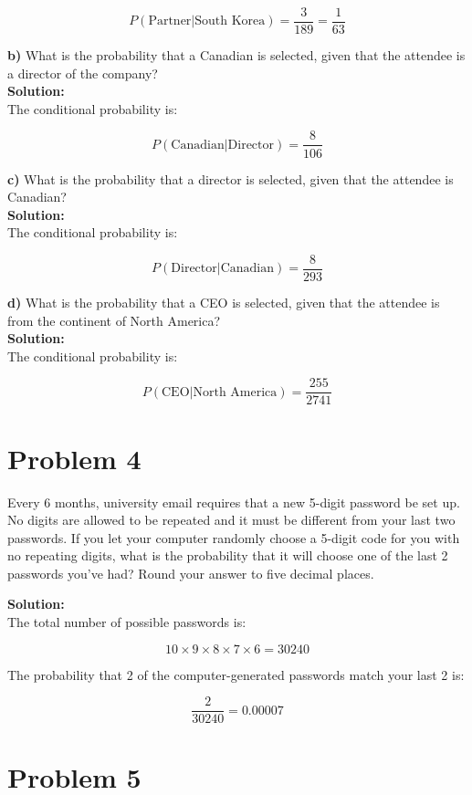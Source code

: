 \documentclass{article}
\begin{document}
\[
P(\text{Partner} | \text{South Korea}) = \frac{3}{189} = \frac{1}{63}
\]

\textbf{b)} What is the probability that a Canadian is selected, given that the attendee is a director of the company?\\
\textbf{Solution:} \\
The conditional probability is:

\[
P(\text{Canadian} | \text{Director}) = \frac{8}{106}
\]

\textbf{c)} What is the probability that a director is selected, given that the attendee is Canadian?\\
\textbf{Solution:} \\
The conditional probability is:

\[
P(\text{Director} | \text{Canadian}) = \frac{8}{293}
\]

\textbf{d)} What is the probability that a CEO is selected, given that the attendee is from the continent of North America?\\
\textbf{Solution:} \\
The conditional probability is:

\[
P(\text{CEO} | \text{North America}) = \frac{255}{2741}
\]

\section*{Problem 4}

Every 6 months, university email requires that a new 5-digit password be set up. No digits are allowed to be repeated and it must be different from your last two passwords. If you let your computer randomly choose a 5-digit code for you with no repeating digits, what is the probability that it will choose one of the last 2 passwords you’ve had? Round your answer to five decimal places.

\textbf{Solution:} \\
The total number of possible passwords is:

\[
10 \times 9 \times 8 \times 7 \times 6 = 30240
\]

The probability that 2 of the computer-generated passwords match your last 2 is:

\[
\frac{2}{30240} = 0.00007
\]

\section*{Problem 5}
\end{document}
